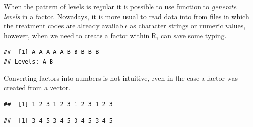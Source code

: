 \documentclass[krantz2]{krantz}\usepackage{knitr}%
\begin{document}
\begin{explainbox}
When the pattern of levels is regular it is possible to use function  to \emph{generate levels} in a factor. Nowadays, it is more usual to read data into \Rlang from files in which the treatment codes are already available as character strings or numeric values, however, when we need to create a factor within R,  can save some typing.

\begin{knitrout}\footnotesize
{}\color{fgcolor}\begin{kframe}
\begin{alltt}
\hlstd{(}\hlstd{,} \hlstd{,}  \hlstd{=} \hlstd{(}\hlstd{,} \hlstd{))}
\end{alltt}
\begin{verbatim}
##  [1] A A A A A B B B B B
## Levels: A B
\end{verbatim}
\end{kframe}
\end{knitrout}
\end{explainbox}

Converting factors into numbers is not intuitive, even in the case a factor was created from a  vector.

\begin{knitrout}\footnotesize
{}\color{fgcolor}\begin{kframe}
\begin{alltt}
 \hlkwb{<-} \hlstd{(}\hlopt{:}\hlstd{,} \hlstd{)}
 \hlkwb{<-} 
\end{alltt}
\begin{verbatim}
##  [1] 1 2 3 1 2 3 1 2 3 1 2 3
\end{verbatim}
\begin{alltt}
\hlstd{(}
\end{alltt}
\begin{verbatim}
##  [1] 3 4 5 3 4 5 3 4 5 3 4 5
\end{verbatim}
\end{kframe}
\end{knitrout}
\end{document}
